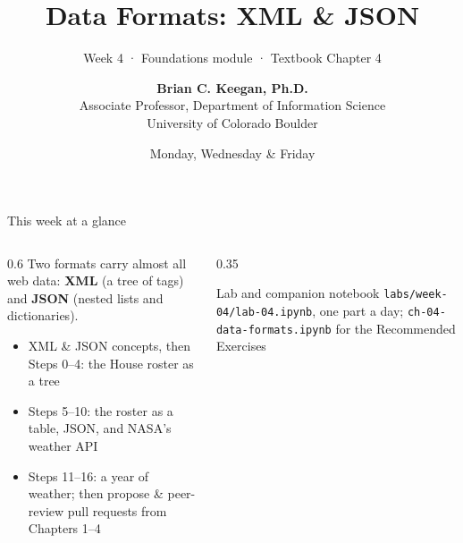 \documentclass[9pt,aspectratio=169]{beamer}
\title[Week 4 · Data Formats]{{\Huge Data Formats: XML \& JSON}}
\subtitle{Week 4 · Foundations module · Textbook Chapter 4}
\author[Keegan]{\textbf{Brian C. Keegan, Ph.D.} \\ Associate Professor, Department of Information Science \\ University of Colorado Boulder}
\date{Monday, Wednesday \& Friday}
\begin{document}
\maketitle

\begin{frame}{This week at a glance}
    \begin{columns}[T]
        \begin{column}{0.6\textwidth}
            Two formats carry almost all web data: \textbf{XML} (a tree of tags) and \textbf{JSON} (nested lists and dictionaries).

            \bigskip

            \begin{itemize}\small
                \item XML \& JSON concepts, then Steps 0--4: the House roster as a tree
            \end{itemize}

            \medskip

            \begin{itemize}\small
                \item Steps 5--10: the roster as a table, JSON, and NASA's weather API
            \end{itemize}

            \medskip

            \begin{itemize}\small
                \item Steps 11--16: a year of weather; then propose \& peer-review pull requests from Chapters 1--4
            \end{itemize}
        \end{column}
        \begin{column}{0.35\textwidth}
            \begin{block}{Lab and companion notebook}
                \footnotesize \texttt{labs/week-04/lab-04.ipynb}, one part a day; \texttt{ch-04-data-formats.ipynb} for the Recommended Exercises
            \end{block}
        \end{column}
    \end{columns}
\end{frame}
\end{document}
